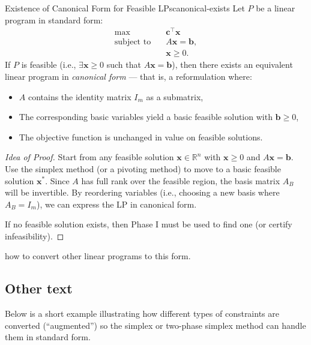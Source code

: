 \begin{proposition}{Existence of Canonical Form for Feasible LPs}{canonical-exists}
Let \( P \) be a linear program in standard form:
\[
\begin{aligned}
\max \quad & \mathbf{c}^\top \mathbf{x} \\
\text{subject to} \quad & A\mathbf{x} = \mathbf{b}, \\
& \mathbf{x} \geq 0.
\end{aligned}
\]
If \( P \) is feasible (i.e., \( \exists \mathbf{x} \geq 0 \) such that \( A\mathbf{x} = \mathbf{b} \)), then there exists an equivalent linear program in \emph{canonical form} — that is, a reformulation where:
\begin{itemize}
    \item \( A \) contains the identity matrix \( I_m \) as a submatrix,
    \item The corresponding basic variables yield a basic feasible solution with \( \mathbf{b} \geq 0 \),
    \item The objective function is unchanged in value on feasible solutions.
\end{itemize}
\end{proposition}

\begin{proof}[Idea of Proof]
Start from any feasible solution \( \mathbf{x} \in \mathbb{R}^n \) with \( \mathbf{x} \geq 0 \) and \( A\mathbf{x} = \mathbf{b} \).  
Use the simplex method (or a pivoting method) to move to a basic feasible solution \( \mathbf{x}^* \).  
Since \( A \) has full rank over the feasible region, the basis matrix \( A_B \) will be invertible.  
By reordering variables (i.e., choosing a new basis where \( A_B = I_m \)), we can express the LP in canonical form.

If no feasible solution exists, then Phase I must be used to find one (or certify infeasibility).
\end{proof}



how to convert other linear programs to this form.



\subsection{Other text}
\noindent
Below is a short example illustrating how different types of constraints are converted (``augmented'') so the simplex or two-phase simplex method can handle them in standard form.

